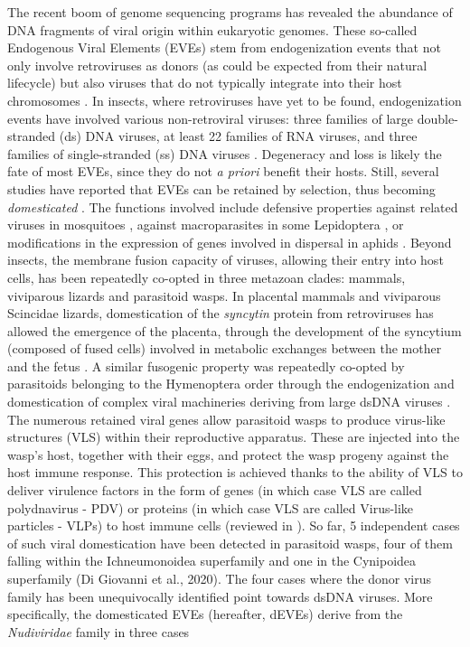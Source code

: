The recent boom of genome sequencing programs has revealed the abundance of DNA fragments of viral origin within eukaryotic genomes. These so-called Endogenous Viral Elements (EVEs) stem from endogenization events that not only involve retroviruses as donors (as could be expected from their natural lifecycle) but also viruses that do not typically integrate into their host chromosomes \citep{katzourakis_endogenous_2010,feschotte_endogenous_2012,aswad_evolutionary_2021}. In insects, where retroviruses have yet to be found, endogenization events have involved various non-retroviral viruses: three families of large double-stranded (ds) DNA viruses, at least 22 families of RNA viruses, and three families of single-stranded (ss) DNA viruses \citep{gilbert_diversity_2022}. Degeneracy and loss is likely the fate of most EVEs, since they do not \textit{a priori} benefit their hosts. Still, several studies have reported that EVEs can be retained by selection, thus becoming \textit{domesticated} \citep{koonin_depths_2018}. The functions involved include defensive properties against related viruses in mosquitoes \citep{yan_origin_2009,suzuki_non-retroviral_2020}, against macroparasites in some Lepidoptera \citep{gasmi_horizontally_2021}, or modifications in the expression of genes involved in dispersal in aphids \citep{parker_laterally_2019}. Beyond insects, the membrane fusion capacity of viruses, allowing their entry into host cells, has been repeatedly co-opted in three metazoan clades: mammals, viviparous lizards and parasitoid wasps. In placental mammals and viviparous Scincidae lizards, domestication of the \textit{syncytin} protein from retroviruses has allowed the emergence of the placenta, through the development of the syncytium (composed of fused cells) involved in metabolic exchanges between the mother and the fetus \citep{lavialle_paleovirology_2013,cornelis_endogenous_2017}. A similar fusogenic property was repeatedly co-opted by parasitoids belonging to the Hymenoptera order through the  endogenization and domestication of complex viral machineries deriving from large dsDNA viruses  \citep{drezen_endogenous_2017, gilbert_diversity_2022}. The numerous retained viral genes allow parasitoid wasps to produce virus-like structures (VLS) within their reproductive apparatus. These are injected into the wasp's host, together with their eggs, and protect the wasp progeny against the host immune response. This protection is achieved thanks to the ability of VLS to deliver virulence factors in the form of genes (in which case VLS are called polydnavirus - PDV) or proteins (in which case VLS are called Virus-like particles - VLPs) to host immune cells (reviewed in \citep{gauthier_recurrent_2018, drezen_bracoviruses_2021}). So far, 5 independent cases of such viral domestication have been detected in parasitoid wasps, four of them falling within the Ichneumonoidea superfamily \citep{bezier_polydnaviruses_2009,volkoff_analysis_2010,pichon_recurrent_2015,burke_common_2019} and one in the Cynipoidea superfamily (Di Giovanni et al., 2020). The four cases where the donor virus family has been unequivocally identified point towards dsDNA viruses. More specifically, the domesticated EVEs (hereafter, dEVEs) derive from the \textit{Nudiviridae} family in three cases 